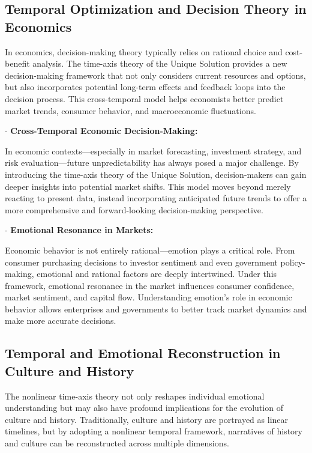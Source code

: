 \documentclass{article}
\begin{document}
\subsection{Temporal Optimization and Decision Theory in Economics}

In economics, decision-making theory typically relies on rational choice and cost-benefit analysis. The time-axis theory of the Unique Solution provides a new decision-making framework that not only considers current resources and options, but also incorporates potential long-term effects and feedback loops into the decision process. This cross-temporal model helps economists better predict market trends, consumer behavior, and macroeconomic fluctuations.

- \textbf{Cross-Temporal Economic Decision-Making:}

In economic contexts—especially in market forecasting, investment strategy, and risk evaluation—future unpredictability has always posed a major challenge. By introducing the time-axis theory of the Unique Solution, decision-makers can gain deeper insights into potential market shifts. This model moves beyond merely reacting to present data, instead incorporating anticipated future trends to offer a more comprehensive and forward-looking decision-making perspective.

- \textbf{Emotional Resonance in Markets:}

Economic behavior is not entirely rational—emotion plays a critical role. From consumer purchasing decisions to investor sentiment and even government policy-making, emotional and rational factors are deeply intertwined. Under this framework, emotional resonance in the market influences consumer confidence, market sentiment, and capital flow. Understanding emotion's role in economic behavior allows enterprises and governments to better track market dynamics and make more accurate decisions.

\subsection{Temporal and Emotional Reconstruction in Culture and History}

The nonlinear time-axis theory not only reshapes individual emotional understanding but may also have profound implications for the evolution of culture and history. Traditionally, culture and history are portrayed as linear timelines, but by adopting a nonlinear temporal framework, narratives of history and culture can be reconstructed across multiple dimensions.
\end{document}
